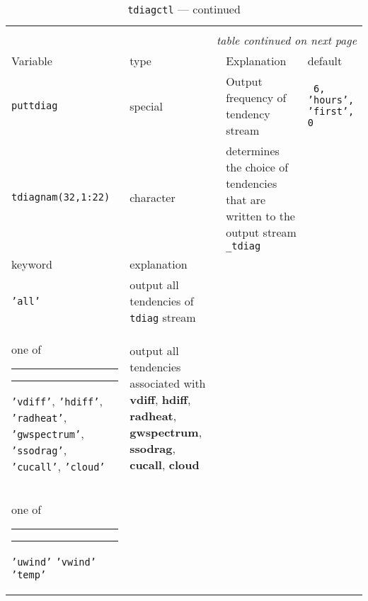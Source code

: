 \begin{longtable}{l@{\extracolsep\fill}lp{7.0cm}p{3.5cm}}\hline\hline
\caption[Namelist {\tt tdiagctl}]{Namelist
  {\tt tdiagctl}}\\\hline\label{tabtdiagctl}
\endfirsthead
\caption[]{{\tt tdiagctl} --- continued}\\\hline
\endhead
\hline\multicolumn{4}{r}{\slshape table continued on next page}\\
\endfoot
\hline %
\endlastfoot
Variable & type & Explanation & default \\\hline
{\tt puttdiag}\index{namelist variables!puttdiag}
& special & Output frequency of tendency stream & {\tt
  6, 'hours', 'first', 0}\\
{\tt tdiagnam(32,1:22)}\index{namelist variables!tdiagnam}
 & character & determines the choice of tendencies
that are written to the output stream {\tt \_tdiag} \newline
\begin{tabular*}{7cm}{p{3cm}|p{3.7cm}}\\\hline
keyword & explanation \\\hline
{\tt 'all'} & output all tendencies of {\tt tdiag} stream\\\hline
one of \rule{2cm}{0cm} 
\rule{2cm}{0cm}\newline
{\tt 'vdiff'}, \newline 
{\tt 'hdiff'}, \newline
{\tt 'radheat'},\newline
{\tt 'gwspectrum'},\newline
{\tt 'ssodrag'},\newline
{\tt 'cucall'},\newline
{\tt 'cloud'}
&
output all tendencies
associated with \newline\newline
{\bf vdiff},\newline
{\bf hdiff},\newline
{\bf radheat},\newline
{\bf gwspectrum},\newline
{\bf ssodrag},\newline 
{\bf cucall}, \newline
{\bf cloud}
\\\hline
one of \rule{2cm}{0cm}
\rule{2cm}{0cm}\newline
{\tt 'uwind'}\newline
{\tt 'vwind'}\newline
{\tt 'temp'}\newline

\end{tabular*}
\end{longtable}
